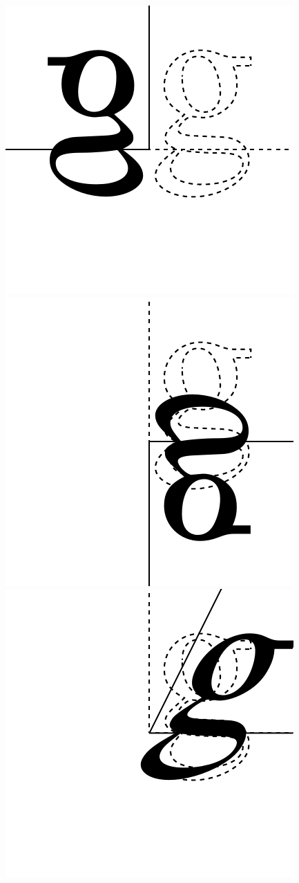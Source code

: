 \begin{figure}[t]
\hfill
\includegraphics[scale=0.5]{mirrorh}
\hfill
\includegraphics[scale=0.5]{mirrorv}
\hfill
\includegraphics[scale=0.5]{shearh}

\end{figure}
